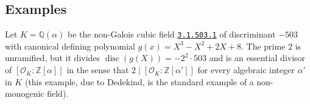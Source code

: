 \documentclass{article}
\def\Z{{\mathbb Z}}
\def\Q{{\mathbb Q}}
\def\OO{{\mathcal O}}
\def\p{{\mathfrak p}}
\def\Qpbar{\overline{\Q_p}}
\DeclareMathOperator{\disc}{disc}
\DeclareMathOperator{\ord}{ord}
\begin{document}
%
%
%

\subsection{Examples}
Let $K=\Q(\alpha)$ be the non-Galois cubic field
\href{www.lmfdb.org/NumberField/3.1.503.1}{\texttt{3.1.503.1}} of
discriminant $-503$ with canonical defining polynomial
$g(x)=X^3-X^2+2X+8$.  The prime $2$ is unramified, but it divides
$\disc(g(X))=-2^2\cdot 503$ and is an essential divisor of
$[\OO_K:\Z[\alpha]]$ in the sense that $2\mid[\OO_K:\Z[\alpha']]$ for
every algebraic integer $\alpha'$ in $K$ (this example, due to
Dedekind, is the standard example of a non-monogenic field).
\end{document}
